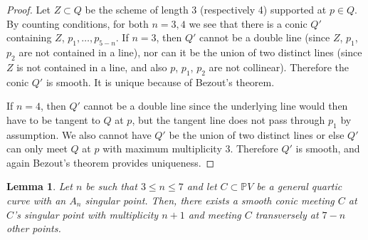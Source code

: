 \documentclass[12 pt, reqno]{amsart}
\newtheorem{lem}[thm]{Lemma}
\theoremstyle{definition}
\newcommand{\mb}{\mathbb}
\renewcommand{\P}{\mb{P}}
\begin{document}
\begin{proof}
  Let $Z \subset Q$ be the scheme of length 3 (respectively 4)
  supported at $p\in Q$.  By counting conditions, for both $n=3,4$ we
  see that there is a conic $Q'$ containing $Z$,
  $p_1,\ldots,p_{5-n}$. If $n=3$, then $Q'$ cannot be a double line
  (since $Z$, $p_1$, $p_2$ are not contained in a line), nor can it be
  the union of two distinct lines (since $Z$ is not contained in a
  line, and also $p$, $p_{1}$, $p_{2}$ are not collinear). Therefore
  the conic $Q'$ is smooth. It is unique because of Bezout's theorem.

  If $n=4$, then $Q'$ cannot be a double line since the underlying
  line would then have to be tangent to $Q$ at $p$, but the tangent
  line does not pass through $p_1$ by assumption. We also cannot have
  $Q'$ be the union of two distinct lines or else $Q'$ can only meet
  $Q$ at $p$ with maximum multiplicity 3. Therefore $Q'$ is smooth,
  and again Bezout's theorem provides uniqueness.
\end{proof}

\begin{lem}
\label{coniclemma}
Let $n$ be such that $3\leq n\leq 7$ and let $C \subset \P V$ be a
general quartic curve with an $A_n$ singular point. Then, there exists
a smooth conic meeting $C$ at $C$'s singular point with multiplicity
$n+1$ and meeting $C$ transversely at $7-n$ other points.
\end{lem}
\end{document}
